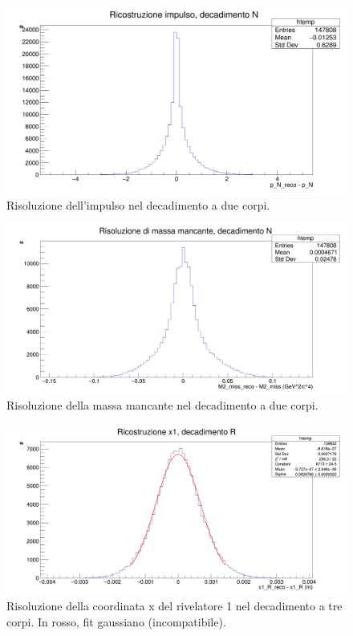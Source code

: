 \documentclass[8pt]{extarticle}
\begin{document}
\begin{figure}[!h]
\begin{center}
\includegraphics[scale=0.25]{reco_p_N}
\caption{Risoluzione dell'impulso nel decadimento a due corpi.}
\label{fig:reco_p_N}
\end{center}
\end{figure}

\begin{figure}[!h]
\begin{center}
\includegraphics[scale=0.25]{reco_miss_N}
\caption{Risoluzione della massa mancante nel decadimento a due corpi.}
\label{fig:reco_miss_N}
\end{center}
\end{figure}

\clearpage

\begin{figure}[!h]
\begin{center}
\includegraphics[scale=0.25]{reco_x1_R}
\caption{Risoluzione della coordinata x del rivelatore 1 nel decadimento a tre corpi. In rosso, fit gaussiano (incompatibile).}
\label{fig:reco_x1_R}
\end{center}
\end{figure}
\end{document}
